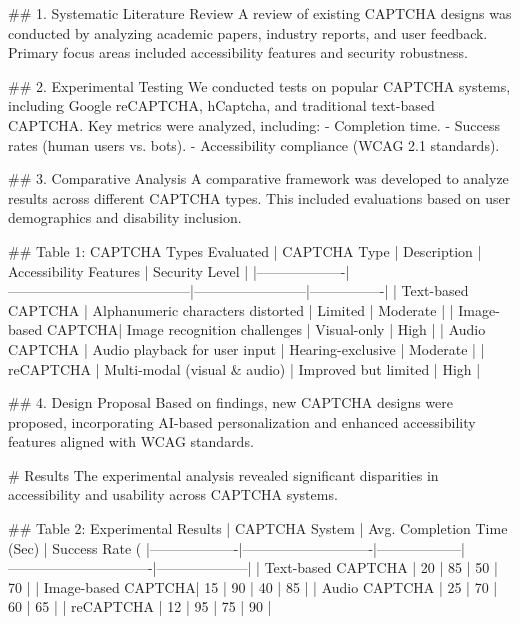 ## 1. Systematic Literature Review  
A review of existing CAPTCHA designs was conducted by analyzing academic papers, industry reports, and user feedback. Primary focus areas included accessibility features and security robustness.

## 2. Experimental Testing  
We conducted tests on popular CAPTCHA systems, including Google reCAPTCHA, hCaptcha, and traditional text-based CAPTCHA. Key metrics were analyzed, including:  
- Completion time.  
- Success rates (human users vs. bots).  
- Accessibility compliance (WCAG 2.1 standards).  

## 3. Comparative Analysis  
A comparative framework was developed to analyze results across different CAPTCHA types. This included evaluations based on user demographics and disability inclusion.

## Table 1: CAPTCHA Types Evaluated  
| CAPTCHA Type      | Description                           | Accessibility Features | Security Level |  
|-------------------|---------------------------------------|------------------------|----------------|  
| Text-based CAPTCHA | Alphanumeric characters distorted    | Limited                | Moderate       |  
| Image-based CAPTCHA| Image recognition challenges         | Visual-only            | High           |  
| Audio CAPTCHA      | Audio playback for user input        | Hearing-exclusive      | Moderate       |  
| reCAPTCHA          | Multi-modal (visual & audio)         | Improved but limited   | High           |  

## 4. Design Proposal  
Based on findings, new CAPTCHA designs were proposed, incorporating AI-based personalization and enhanced accessibility features aligned with WCAG standards.

# Results  
The experimental analysis revealed significant disparities in accessibility and usability across CAPTCHA systems.  

## Table 2: Experimental Results  
| CAPTCHA System    | Avg. Completion Time (Sec) | Success Rate (%
|-------------------|----------------------------|------------------|-------------------------------|--------------------|  
| Text-based CAPTCHA | 20                         | 85               | 50                            | 70                 |  
| Image-based CAPTCHA| 15                         | 90               | 40                            | 85                 |  
| Audio CAPTCHA      | 25                         | 70               | 60                            | 65                 |  
| reCAPTCHA          | 12                         | 95               | 75                            | 90                 |  

